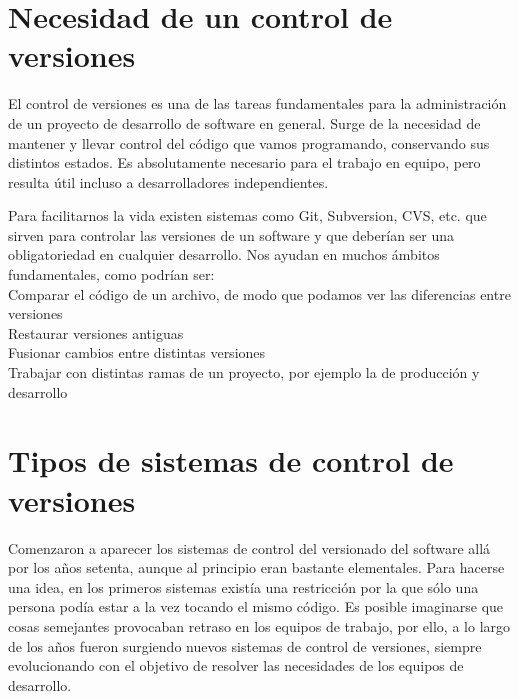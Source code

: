 \section{Necesidad de un control de versiones}
\begin{itemize}
El control de versiones es una de las tareas fundamentales para la administración de un proyecto de desarrollo de software en general. Surge de la necesidad de mantener y llevar control del código que vamos programando, conservando sus distintos estados. Es absolutamente necesario para el trabajo en equipo, pero resulta útil incluso a desarrolladores independientes.
\end{itemize}

\begin{itemize}
Para facilitarnos la vida existen sistemas como Git, Subversion, CVS, etc. que sirven para controlar las versiones de un software y que deberían ser una obligatoriedad en cualquier desarrollo. Nos ayudan en muchos ámbitos fundamentales, como podrían ser:\\

Comparar el código de un archivo, de modo que podamos ver las diferencias entre versiones\\
Restaurar versiones antiguas\\
Fusionar cambios entre distintas versiones\\
Trabajar con distintas ramas de un proyecto, por ejemplo la de producción y desarrollo\\
\end{itemize}

\section{Tipos de sistemas de control de versiones}
\begin{itemize}
Comenzaron a aparecer los sistemas de control del versionado del software allá por los años setenta, aunque al principio eran bastante elementales. Para hacerse una idea, en los primeros sistemas existía una restricción por la que sólo una persona podía estar a la vez tocando el mismo código. Es posible imaginarse que cosas semejantes provocaban retraso en los equipos de trabajo, por ello, a lo largo de los años fueron surgiendo nuevos sistemas de control de versiones, siempre evolucionando con el objetivo de resolver las necesidades de los equipos de desarrollo.
\end{itemize}

